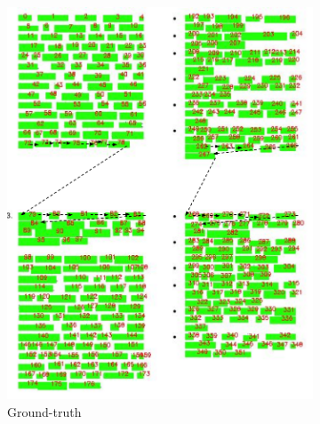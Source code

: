 \begin{figure}[ht]
  \centering
  \small
      \begin{subfigure}[b]{0.4\textwidth}
        \includegraphics[width=\textwidth]{images/chapter4/gold_multicolumn_with_ro.pdf}
        \caption{Ground-truth}
      \end{subfigure}
      \begin{subfigure}[b]{0.4\textwidth}

\end{subfigure}
\end{figure}
